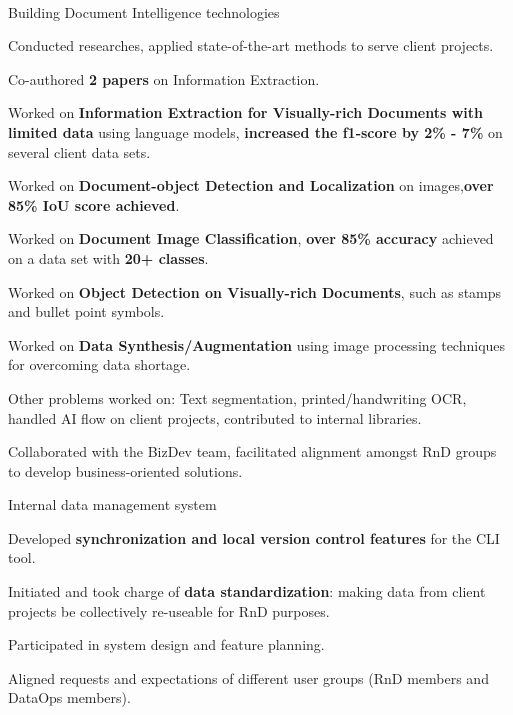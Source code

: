 \\
\begin{xitemize}
    \item Building Document Intelligence technologies
    \begin{zitemize}
        \item Conducted researches, applied state-of-the-art methods to serve client projects.
        \item Co-authored \textbf{2 papers} on Information Extraction.
        \item Worked on \textbf{Information Extraction for Visually-rich Documents with limited data} using language models, \textbf{increased the f1-score by 2\%  - 7\%} on several client data sets.
        \item Worked on \textbf{Document-object Detection and Localization} on images,\textbf{over 85\% IoU score achieved}.
        \item Worked on \textbf{Document Image Classification}, \textbf{over 85\% accuracy} achieved on a data set with \textbf{20+ classes}.
        \item Worked on \textbf{Object Detection on Visually-rich Documents}, such as stamps and bullet point symbols.
        \item Worked on \textbf{Data Synthesis/Augmentation} using image processing techniques for overcoming data shortage.
        \item Other problems worked on: Text segmentation, printed/handwriting OCR, handled AI flow on client projects, contributed to internal libraries.
        \item Collaborated with the BizDev team, facilitated alignment amongst RnD groups to develop business-oriented solutions.
    \end{zitemize}
    \item Internal data management system
    \begin{zitemize}
        \item Developed \textbf{synchronization and local version control features} for the CLI tool.
        \item Initiated and took charge of \textbf{data standardization}: making data from client projects be collectively re-useable for RnD purposes.
        \item Participated in system design and feature planning.
        \item Aligned requests and expectations of different user groups (RnD members and DataOps members).

\end{zitemize}
\end{xitemize}
